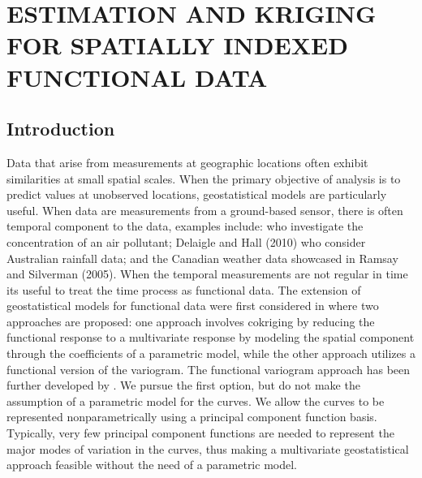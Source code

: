 

\chapter{ESTIMATION AND KRIGING FOR SPATIALLY INDEXED FUNCTIONAL DATA} 
\label{ch:functional kriging}

\section{Introduction} 

\label{sec:introduction}
Data that arise from measurements at geographic locations often exhibit similarities at small spatial scales. When the primary objective of analysis is to predict values at unobserved locations, geostatistical models are particularly useful. When data are measurements from a ground-based sensor, there is often temporal component to the data, examples include: \cite{Kaiser:2002wna} who investigate the concentration of an air pollutant; Delaigle and Hall (2010) who consider Australian rainfall data; and the Canadian weather data showcased in Ramsay and Silverman (2005). When the temporal measurements are not regular in time its useful to treat the time process as functional data. The extension of geostatistical models for functional data were first considered in \cite{Goulard:1993} where two approaches are proposed: one approach involves cokriging by reducing the functional response to a multivariate response by modeling the spatial component through the coefficients of a parametric model, while the other approach utilizes a functional version of the variogram. The functional variogram approach has been further developed by \cite{Giraldo:2010jx}. We pursue the first option, but do not make the assumption of a parametric model for the curves. We allow the curves to be represented nonparametrically using a principal component function basis. Typically, very few principal component functions are needed to represent the major modes of variation in the curves, thus making a multivariate geostatistical approach feasible without the need of a parametric model. 




